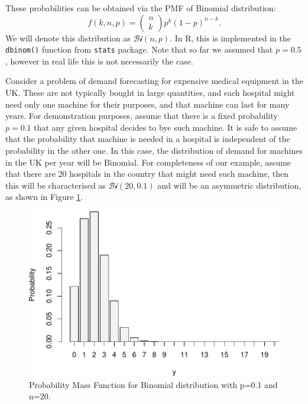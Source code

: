 \documentclass[
]{book}
\theoremstyle{definition}
\theoremstyle{definition}
\theoremstyle{definition}
\theoremstyle{definition}
\theoremstyle{remark}
\begin{document}
These probabilities can be obtained via the PMF of Binomial distribution:
\begin{equation}
    f(k, n, p) = \begin{pmatrix} n \\ k \end{pmatrix} p^k (1-p)^{n-k} .
    \label{eq:BernoulliPMF}
\end{equation}
We will denote this distribution as \(\mathcal{Bi}(n, p)\). In R, this is implemented in the \texttt{dbinom()} function from \texttt{stats} package. Note that so far we assumed that \(p=0.5\), however in real life this is not necessarily the case.

Consider a problem of demand forecasting for expensive medical equipment in the UK. These are not typically bought in large quantities, and each hospital might need only one machine for their purposes, and that machine can last for many years. For demonstration purposes, assume that there is a fixed probability \(p=0.1\) that any given hospital decides to bye such machine. It is safe to assume that the probability that machine is needed in a hospital is independent of the probability in the other one. In this case, the distribution of demand for machines in the UK per year will be Binomial. For completeness of our example, assume that there are 20 hospitals in the country that might need such machine, then this will be characterised as \(\mathcal{Bi}(20, 0.1)\) and will be an asymmetric distribution, as shown in Figure \ref{fig:binomialPMF01}.

\begin{figure}
\centering
\includegraphics{Svetunkov---Statistics-for-Business-Analytics_files/figure-latex/binomialPMF01-1.pdf}
\caption{\label{fig:binomialPMF01}Probability Mass Function for Binomial distribution with p=0.1 and n=20.}
\end{figure}
\end{document}
